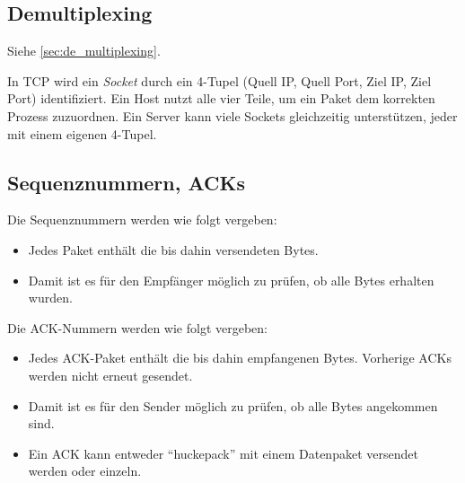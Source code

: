 \documentclass[a4paper, 11pt, accentcolor = tud3b]{tudreport}
\begin{document}
            \subsection{Demultiplexing}
                Siehe \ref{sec:de_multiplexing}.
                
                In TCP wird ein \textit{Socket} durch ein 4-Tupel (Quell IP, Quell Port, Ziel IP, Ziel Port) identifiziert. Ein Host nutzt alle vier Teile, um ein Paket dem korrekten Prozess zuzuordnen. Ein Server kann viele Sockets gleichzeitig unterstützen, jeder mit einem eigenen 4-Tupel.

            \subsection{Sequenznummern, ACKs}
                Die Sequenznummern werden wie folgt vergeben:
                \begin{itemize}
                	\item Jedes Paket enthält die bis dahin versendeten Bytes.
                	\item Damit ist es für den Empfänger möglich zu prüfen, ob alle Bytes erhalten wurden.
                \end{itemize}
                Die ACK-Nummern werden wie folgt vergeben:
                \begin{itemize}
                	\item Jedes ACK-Paket enthält die bis dahin empfangenen Bytes. Vorherige ACKs werden nicht erneut gesendet.
                	\item Damit ist es für den Sender möglich zu prüfen, ob alle Bytes angekommen sind.
                	\item Ein ACK kann entweder \enquote{huckepack} mit einem Datenpaket versendet werden oder einzeln.
                \end{itemize}
                
\end{document}

